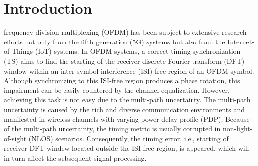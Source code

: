 \documentclass[conference]{IEEEtran}
\begin{document}
\section{Introduction}\label{I:I}
 frequency division multiplexing (OFDM) has been subject to extensive research efforts not only from the fifth generation (5G) systems but also from the Internet-of-Things (IoT) systems\cite{ref:IoT5GWiFi}.
In OFDM systems, a correct timing synchronization (TS) aims to find the starting of the receiver discrete Fourier transform (DFT) window within an inter-symbol-interference (ISI)-free region of an OFDM symbol\cite{ref:ISIf3}. Although synchronizing to this ISI-free region produces a phase rotation, this impairment can be easily countered by the channel equalization\cite{ref:ISI5}.
However, achieving this task is not easy due to the multi-path uncertainty.
The multi-path uncertainty is caused by the rich and diverse communication environments\cite{ref:CIRvar} and manifested in wireless channels with varying power delay profile (PDP).
Because of the multi-path uncertainty, the timing metric is usually corrupted in non-light-of-sight (NLOS) scenarios. Consequently, the timing error, i.e., starting of receiver DFT window located outside the ISI-free region, is appeared, which will in turn affect the  subsequent signal processing.
\end{document}
